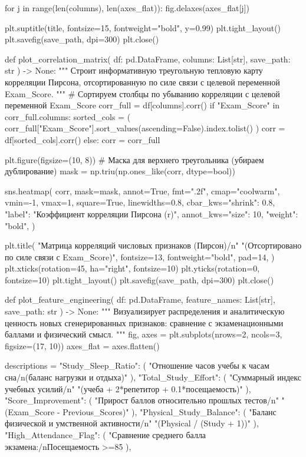 \documentclass[14pt,a4paper]{extarticle}
\begin{document}
\begin{CodeListing}
    for j in range(len(columns), len(axes_flat)):
        fig.delaxes(axes_flat[j])

    plt.suptitle(title, fontsize=15, fontweight="bold", y=0.99)
    plt.tight_layout()
    plt.savefig(save_path, dpi=300)
    plt.close()


def plot_correlation_matrix(
    df: pd.DataFrame, columns: List[str], save_path: str
) -> None:
    """
    Строит информативную треугольную тепловую карту корреляции Пирсона,
    отсортированную по силе связи с целевой переменной Exam_Score.
    """
    # Сортируем столбцы по убыванию корреляции с целевой переменной Exam_Score
    corr_full = df[columns].corr()
    if "Exam_Score" in corr_full.columns:
        sorted_cols = (
            corr_full["Exam_Score"].sort_values(ascending=False).index.tolist()
        )
        corr = df[sorted_cols].corr()
    else:
        corr = corr_full

    plt.figure(figsize=(10, 8))
    # Маска для верхнего треугольника (убираем дублирование)
    mask = np.triu(np.ones_like(corr, dtype=bool))

    sns.heatmap(
        corr,
        mask=mask,
        annot=True,
        fmt=".2f",
        cmap="coolwarm",
        vmin=-1,
        vmax=1,
        square=True,
        linewidths=0.8,
        cbar_kws={"shrink": 0.8, "label": "Коэффициент корреляции Пирсона (r)"},
        annot_kws={"size": 10, "weight": "bold"},
    )

    plt.title(
        "Матрица корреляций числовых признаков (Пирсон)/n"
        "(Отсортировано по силе связи с Exam_Score)",
        fontsize=13,
        fontweight="bold",
        pad=14,
    )
    plt.xticks(rotation=45, ha="right", fontsize=10)
    plt.yticks(rotation=0, fontsize=10)
    plt.tight_layout()
    plt.savefig(save_path, dpi=300)
    plt.close()


def plot_feature_engineering(
    df: pd.DataFrame, feature_names: List[str], save_path: str
) -> None:
    """
    Визуализирует распределения и аналитическую ценность новых
    сгенерированных признаков: сравнение с экзаменационными баллами
    и физический смысл.
    """
    fig, axes = plt.subplots(nrows=2, ncols=3, figsize=(17, 10))
    axes_flat = axes.flatten()

    descriptions = {
        "Study_Sleep_Ratio": (
            "Отношение часов учебы к часам сна/n(баланс нагрузки и отдыха)"
        ),
        "Total_Study_Effort": (
            "Суммарный индекс учебных усилий/n"
            "(учеба + 2*репетитор + 0.1*посещаемость)"
        ),
        "Score_Improvement": (
            "Прирост баллов относительно прошлых тестов/n"
            "(Exam_Score - Previous_Scores)"
        ),
        "Physical_Study_Balance": (
            "Баланс физической и умственной активности/n"
            "(Physical / (Study + 1))"
        ),
        "High_Attendance_Flag": (
            "Сравнение среднего балла экзамена:/nПосещаемость >=85%
        ),
    }


\end{CodeListing}
\end{document}
